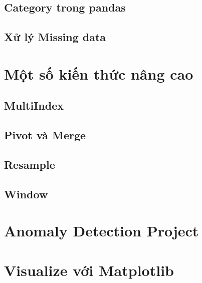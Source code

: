 \documentclass[
]{book}
\begin{document}
\hypertarget{category-trong-pandas}{%
\section{Category trong pandas}\label{category-trong-pandas}}

\hypertarget{xux1eed-luxfd-missing-data}{%
\section{Xử lý Missing data}\label{xux1eed-luxfd-missing-data}}

\hypertarget{mux1ed9t-sux1ed1-kiux1ebfn-thux1ee9c-nuxe2ng-cao}{%
\chapter{Một số kiến thức nâng cao}\label{mux1ed9t-sux1ed1-kiux1ebfn-thux1ee9c-nuxe2ng-cao}}

\hypertarget{multiindex}{%
\section{MultiIndex}\label{multiindex}}

\hypertarget{pivot-vuxe0-merge}{%
\section{Pivot và Merge}\label{pivot-vuxe0-merge}}

\hypertarget{resample}{%
\section{Resample}\label{resample}}

\hypertarget{window}{%
\section{Window}\label{window}}

\hypertarget{anomaly-detection-project}{%
\chapter{Anomaly Detection Project}\label{anomaly-detection-project}}

\hypertarget{visualize-vux1edbi-matplotlib}{%
\chapter{Visualize với Matplotlib}\label{visualize-vux1edbi-matplotlib}}

  
\end{document}
